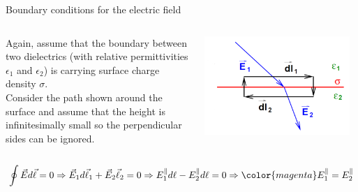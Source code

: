 %
%
%

\begin{frame}{Boundary conditions for the electric field}

\begin{columns}
  \begin{column}{0.50\textwidth}
   {\small
     Again, assume that the boundary between two dielectrics (with relative
     permittivities $\epsilon_1$ and  $\epsilon_2$)
     is carrying surface charge density $\sigma$.\\
     Consider the path shown around the surface and
     assume that the height is infinitesimally small so the perpendicular
     sides can be ignored.
  }
  \end{column}
  \begin{column}{0.50\textwidth}
    \begin{center}
      \includegraphics[width=0.95\textwidth]{./images/schematics/boundary_conditions_electric_field_2.png}\\
    \end{center}
  \end{column}
\end{columns}

\begin{equation*}
  \oint \vec{E} d\vec{\ell} = 0 \Rightarrow
     \vec{E}_1 d\vec{\ell}_1 + \vec{E}_2 \vec{\ell}_2 = 0 \Rightarrow
       E_1^{\parallel} d\ell - E_2^{\parallel} d\ell = 0 \Rightarrow
         {\color{magenta} E_1^{\parallel} = E_2^{\parallel}}
\end{equation*}

\end{frame}

%
%
%

